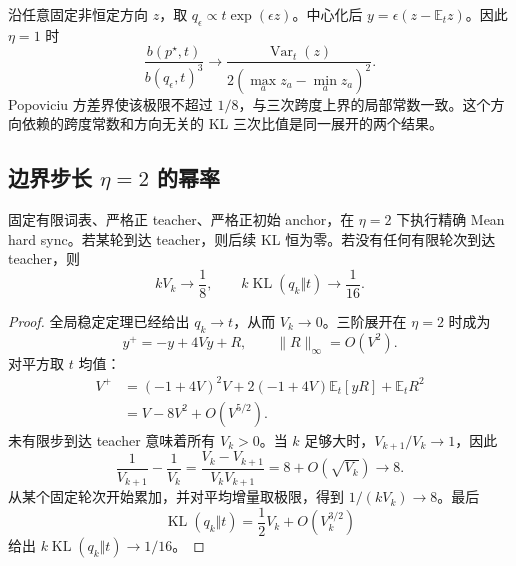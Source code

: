 \documentclass[lang=cn,scheme=chinese,openany]{../book/elegantbook}
\newcommand{\E}{\mathbb E}
\newcommand{\KL}{\operatorname{KL}}
\newcommand{\Var}{\operatorname{Var}}
\begin{document}
沿任意固定非恒定方向 $z$，取 $q_\epsilon\propto t\exp(\epsilon z)$。中心化后 $y=\epsilon(z-\E_tz)$。因此 $\eta=1$ 时
\begin{equation*}
 \frac{b(p^\star,t)}{b(q_\epsilon,t)^3}
 \longrightarrow
 \frac{\Var_t(z)}{2(\max_a z_a-\min_a z_a)^2}.
\end{equation*}
Popoviciu 方差界使该极限不超过 $1/8$，与三次跨度上界的局部常数一致。这个方向依赖的跨度常数和方向无关的 KL 三次比值是同一展开的两个结果。

\subsection{边界步长 \texorpdfstring{$\eta=2$}{eta=2} 的幂率}
\label{dyn:sec:mean-hard-sync-boundary-rate}

\begin{theorem}
\label{dyn:thm:mean-hard-sync-boundary-rate}
固定有限词表、严格正 teacher、严格正初始 anchor，在 $\eta=2$ 下执行精确 Mean hard sync。若某轮到达 teacher，则后续 KL 恒为零。若没有任何有限轮次到达 teacher，则
\begin{equation}
 kV_k\longrightarrow\frac18,
 \qquad k\KL(q_k\Vert t)\longrightarrow\frac1{16}.
 \label{dyn:eq:mean-hard-sync-boundary-rate}
\end{equation}
\end{theorem}

\begin{proof}
全局稳定定理已经给出 $q_k\to t$，从而 $V_k\to0$。三阶展开在 $\eta=2$ 时成为
\begin{equation*}
 y^+=-y+4Vy+R,\qquad \|R\|_\infty=O(V^2).
\end{equation*}
对平方取 $t$ 均值：
\begin{align*}
 V^+
 &=(-1+4V)^2V+2(-1+4V)\E_t[yR]+\E_tR^2\\
 &=V-8V^2+O(V^{5/2}).
\end{align*}
未有限步到达 teacher 意味着所有 $V_k>0$。当 $k$ 足够大时，$V_{k+1}/V_k\to1$，因此
\begin{equation*}
 \frac1{V_{k+1}}-\frac1{V_k}
 =\frac{V_k-V_{k+1}}{V_kV_{k+1}}
 =8+O(\sqrt{V_k})\longrightarrow8.
\end{equation*}
从某个固定轮次开始累加，并对平均增量取极限，得到 $1/(kV_k)\to8$。最后
\begin{equation*}
 \KL(q_k\Vert t)=\frac12V_k+O(V_k^{3/2})
\end{equation*}
给出 $k\KL(q_k\Vert t)\to1/16$。
\end{proof}
\end{document}
